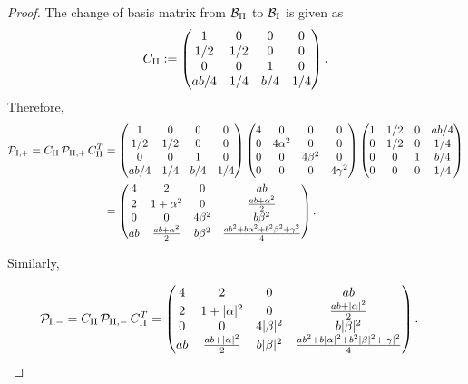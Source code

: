 \documentclass[table]{amsart}
\numberwithin{equation}{section}
\begin{document}
\begin{proof}
    The change of basis matrix from $\mathcal{B}_{\rm{II}}$ to $\mathcal{B}_{\rm{I}}$ is given as
    $$
    C_{\rm{II}}:= 
    \begin{pmatrix}
1 & 0 & 0 & 0 \\
1/2 & 1/2 & 0 & 0 \\
0 & 0 & 1 & 0 \\
ab/4 & 1/4 & b/4 & 1/4
\end{pmatrix}.
    $$
    Therefore, 
    \begin{align*}
    \mathcal{P}_{\rm{I}, +} = C_{\rm{II}} \, \mathcal{P}_{\rm{II}, +} \, C_{\rm{II}}^T &= 
    \begin{pmatrix}
1 & 0 & 0 & 0 \\
1/2 & 1/2 & 0 & 0 \\
0 & 0 & 1 & 0 \\
ab/4 & 1/4 & b/4 & 1/4
\end{pmatrix}
\begin{pmatrix}
4 & 0 & 0 & 0 \\
0 & 4\alpha^2 & 0 & 0 \\
0 & 0 & 4\beta^2 & 0 \\
0 & 0 & 0 & 4\gamma^2
\end{pmatrix}
 \begin{pmatrix}
1 & 1/2 & 0 & ab/4 \\
0 & 1/2 & 0 & 1/4 \\
0 & 0 & 1 &  b/4 \\
0 & 0 &0 & 1/4
\end{pmatrix} \\ 
&= \begin{pmatrix}
4 & 2 & 0 & ab \\
2 & 1 + \alpha^2 & 0 & \frac{ab + \alpha^2}{2} \\
0 & 0 & 4\beta^2 & b\beta^2 \\
ab & \frac{ab + \alpha^2}{2} & b\beta^2 & \frac{a b^2 + b \alpha^2 + b^2 \beta^2 + \gamma^2}{4}
\end{pmatrix}.
    \end{align*}

\noindent
Similarly, 
 
    \begin{align*}
    \mathcal{P}_{\rm{I}, -} = C_{\rm{II}} \, \mathcal{P}_{\rm{II}, -} \, C_{\rm{II}}^T &= \begin{pmatrix}
4 & 2 & 0 & ab \\
2 & 1 + |\alpha|^2 & 0 & \frac{ab + |\alpha|^2}{2} \\
0 & 0 & 4|\beta|^2 & b|\beta|^2 \\
ab & \frac{ab + |\alpha|^2}{2} & b|\beta|^2 & \frac{a b^2 + b |\alpha|^2 + b^2 |\beta|^2 + |\gamma|^2}{4}
\end{pmatrix}.
    \end{align*}
\end{proof}
\end{document}
